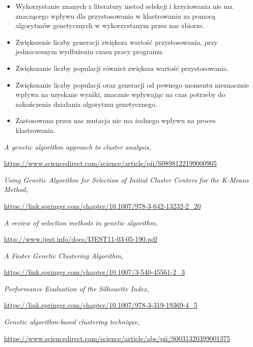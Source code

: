 \documentclass{classrep}
\begin{document}
\begin{itemize}
    \item Wykorzystanie znanych z literatury metod selekcji i krzyżowania nie ma znaczącego wpływu dla przystosowania w klastrowaniu za pomocą algorytmów genetycznych w wykorzystanym przez nas zbiorze.
    \item Zwiększenie liczby generacji zwiększa wartość przystosowania, przy jednoczesnym wydłużeniu czasu pracy programu.
    \item Zwiększanie liczby populacji  również zwiększa wartość przystosowania.
    \item Zwiększanie liczby populacji oraz generacji od pewnego momentu nieznacznie wpływa na uzyskane wyniki, znacznie wpływając na czas potrzeby do zakończenia działania algorytmu genetycznego.
    \item Zastosowana przez nas mutacja nie ma żadnego wpływu na proces klastrowania.

\end{itemize}

\newpage

\nocite{*}
\begin{thebibliography}{0}
    \textsl{A genetic algorithm approach to cluster analysis,}
    \author{M.C. Cowgill, R.J. Harvey, L.T. Watson,}
    \url{https://www.sciencedirect.com/science/article/pii/S0898122199000905}
    
    \textsl{Using Genetic Algorithm for Selection of Initial Cluster Centers for the K-Means Method,}
    \author{W. Kwedlo, P. Iwanowicz,}
    \url{https://link.springer.com/chapter/10.1007/978-3-642-13232-2_20}

    \textsl{A review of selection methods in genetic algorithm,}
    \author{R. Sivaraj,}
    \url{http://www.ijest.info/docs/IJEST11-03-05-190.pdf}

    \textsl{A Faster Genetic Clustering Algorithm,}
    \author{L Meng,Q H Wu,Z Z Yong,}
    \url{https://link.springer.com/chapter/10.1007/3-540-45561-2_3}

    \textsl{Performance Evaluation of the Silhouette Index,}
    \author{A. Starczewski, A. Krzyżak,}
    \url{https://link.springer.com/chapter/10.1007/978-3-319-19369-4\_5}

    \textsl{Genetic algorithm-based clustering technique,}
    \author{Ujjwal Maulika, Sanghamitra Bandyopadhyay,}
    \url{https://www.sciencedirect.com/science/article/abs/pii/S0031320399001375}



    
\end{thebibliography}
\end{document}
